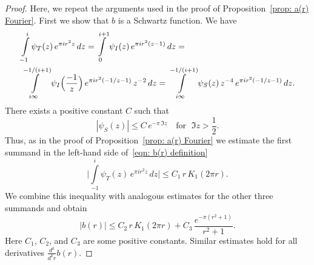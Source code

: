 \begin{proof}
Here, we repeat the arguments used in the proof of Proposition~\ref{prop: a(r) Fourier}. First we show that $b$ is a Schwartz function. We have
\begin{align}
  &\int\limits_{-1}^{i}\psi_T(z)\,e^{\pi i r^2 z}\,dz=\int\limits_{0}^{i+1}\psi_I(z)\,e^{\pi i r^2 (z-1)}\,dz=\notag\\
  &\int\limits_{i\infty}^{-1/(i+1)}\psi_I\Big(\frac{-1}{z}\Big)\,e^{\pi i r^2 (-1/z-1)}\,z^{-2}\,dz=\int\limits_{i\infty}^{-1/(i+1)}\psi_S(z)\,z^{-4}\,e^{\pi i r^2 (-1/z-1)}\,dz.\notag
\end{align}
There exists a positive constant $C$ such that
$$|\psi_S(z)|\leq C\,e^{-\pi\,\Im{z}}\quad\mbox{for }\;\Im{z}>\frac12.$$
Thus, as in the proof of Proposition~\ref{prop: a(r) Fourier} we estimate the first summand in the left-hand side of~\eqref{eqn: b(r) definition}
$$\Bigg|\int\limits_{-1}^i \psi_T(z)\,e^{\pi i r^2 z}\,dz \Bigg|\leq C_1\,r\,K_1(2\pi r).$$
We combine this inequality with analogous estimates for the other three summands and obtain
$$|b(r)|\leq C_2\,r\,K_1(2\pi r)+C_3\,\frac{e^{-\pi(r^2+1)}}{r^2+1}.$$
Here $C_1$, $C_2$, and $C_3$ are some positive constants. Similar estimates hold for all derivatives $\frac{d^k}{d^k r} b(r)$.


\end{proof}
